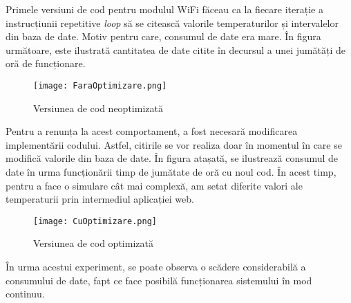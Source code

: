 	Primele versiuni de cod pentru modulul WiFi făceau ca la fiecare iterație a instrucțiunii repetitive \textit{loop} să se citească valorile temperaturilor și intervalelor din baza de date. Motiv pentru care, consumul de date era mare.  În figura următoare, este ilustrată cantitatea de date citite în decursul a unei jumătăți de oră de funcționare.
 
\begin{figure}[H]
   	\centering
    	\texttt{[image: FaraOptimizare.png]}
	\caption{Versiunea de cod neoptimizată}
\end{figure}

	Pentru a renunța la acest comportament, a fost necesară modificarea implementării codului. Astfel, citirile se vor realiza doar în momentul în care se modifică valorile din baza de date. În figura atașată, se ilustrează consumul de date în urma funcționării timp de jumătate de oră cu noul cod. În acest timp, pentru a face o simulare cât mai complexă, am setat diferite valori ale temperaturii prin intermediul aplicației web. 

\begin{figure}[H]
   	\centering
    	\texttt{[image: CuOptimizare.png]}
	\caption{Versiunea de cod optimizată}
\end{figure}

	În urma acestui experiment, se poate observa o scădere considerabilă a consumului de date, fapt ce face posibilă funcționarea sistemului în mod continuu. 

